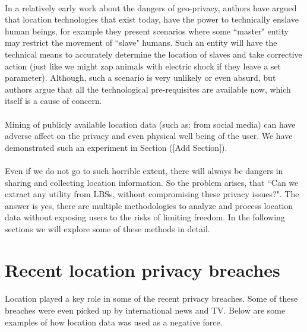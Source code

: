 \documentclass[12pt]{report}
\begin{document}
\paragraph{}
In a relatively early work \cite{dobson2003geoslavery} about the dangers of geo-privacy, authors have argued that location technologies that exist today, have the power to technically enslave human beings, for example they present scenarios where some ``master" entity may restrict the movement of ``slave" humans. Such an entity will have the technical means to accurately determine the location of slaves and take corrective action (just like we might zap animals with electric shock if they leave a set parameter). Although, such a scenario is very unlikely or even absurd, but authors argue that all the technological pre-requisites are available now, which itself is a cause of concern.

\paragraph{}
Mining of publicly available location data (such as: from social media) can have adverse affect on the privacy and even physical well being of the user. We have demonstrated such an experiment in Section ([Add Section]). 



\paragraph{}
Even if we do not go to such horrible extent, there will always be dangers in sharing and collecting location information. So the problem arises, that ``Can we extract any utility from LBSs, without compromising these privacy issues?". The answer is yes, there are multiple methodologies to analyze and process location data without exposing users to the risks of limiting freedom.  In the following sections we will explore some of these methods in detail.

\section{Recent location privacy breaches}
\paragraph{}
Location played a key role in some of the recent privacy breaches. Some of these breaches were even picked up by international news and TV. Below are some examples of how location data was used as a negative force.
\end{document}
